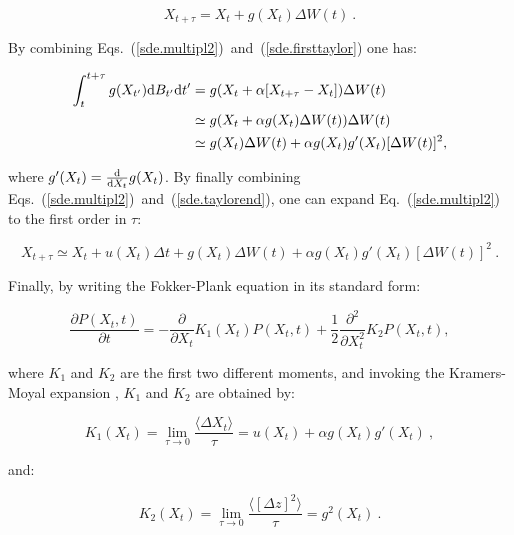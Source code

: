 \begin{equation}
	X_{t+\tau} = X_t + g(X_t)\Delta W(t)~.
	\label{sde.firsttaylor}
\end{equation}

By combining Eqs.~(\ref{sde.multipl2})~and~(\ref{sde.firsttaylor}) one has:

\begin{equation}
	\begin{aligned}
		\int_{t}^{t+\tau} g(X_{t'}) \textnormal{d}B_{t'}\textnormal{d}t' &= g(X_t + \alpha[X_{t + \tau} - X_t])\Delta W(t) \\
		&\simeq g(X_t + \alpha g(X_t)\Delta W(t))\Delta W(t)\\
		&\simeq g(X_t) \Delta W(t) + \alpha g(X_t)g'(X_t)[\Delta W(t)]^2,
	\end{aligned}
	\label{sde.taylorend}
\end{equation}

where $g'(X_t) = \frac{\textnormal{d}}{\textnormal{d} X_t} g(X_t) $. By finally combining Eqs.~(\ref{sde.multipl2})~and~(\ref{sde.taylorend}), one can expand Eq.~(\ref{sde.multipl2}) to the first order in $\tau$:

\begin{equation}
	X_{t+\tau } \simeq X_t + u(X_t)\Delta t + g(X_t) \Delta W(t) + \alpha g(X_t)g'(X_t)[\Delta W(t)]^2 ~.
\end{equation}

Finally, by writing the Fokker-Plank equation in its standard form:

\begin{equation}
	\frac{\partial P(X_t, t)}{\partial t} = -\frac{\partial}{\partial X_t} K_1 (X_t) P(X_t, t) + \frac{1}{2}\frac{\partial^2}{\partial X_t^2} K_2P(X_t, t),
\end{equation}

where $K_1$ and $K_2$ are the first two different moments, and invoking the Kramers-Moyal expansion \cite{sancho_brownian_2011, stratonovich_new_1966}, $K_1$ and $K_2$ are obtained by:

\begin{equation}
	K_1(X_t) = \lim\limits_{\tau \rightarrow 0} \frac{\langle \Delta X_t \rangle}{\tau}  = u(X_t) + \alpha g(X_t)g'(X_t)~,
\end{equation}

and:

\begin{equation}
	K_2(X_t) = \lim\limits_{\tau \rightarrow 0} \frac{\langle [\Delta z]^2\rangle}{\tau} = g^2(X_t) ~.
\end{equation}

